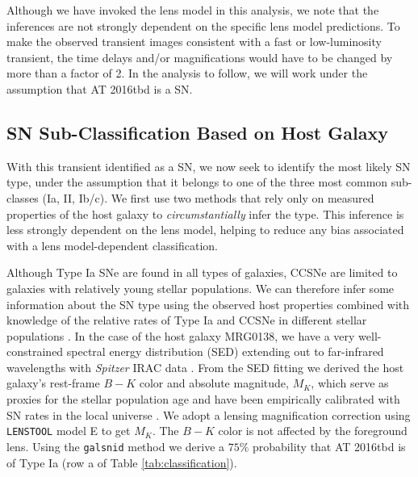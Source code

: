 \documentclass[12pt]{article}
\def\SNABC{AT 2016tbd\xspace}
\def\lenstool{{\tt LENSTOOL}\xspace}
\begin{document}
{Although we have invoked the lens model in this analysis, we note that the inferences are not strongly dependent on the specific lens model predictions.  To make the observed transient images consistent with a fast or low-luminosity transient, the time delays and/or magnifications would have to be changed by more than a factor of 2.  In the analysis to follow, we will work under the assumption that \SNABC is a SN. 


\subsection*{SN Sub-Classification Based on Host Galaxy}
With this transient identified as a SN, we now seek to identify the most likely SN type, under the assumption that it belongs to one of the three most common sub-classes (Ia, II, Ib/c).   We first use two methods that rely only on measured properties of the host galaxy to {\it circumstantially} infer the type. This inference is less strongly dependent on the lens model, helping to reduce any bias associated with a lens model-dependent classification. 

Although Type Ia SNe are found in all types of galaxies, CCSNe are limited to galaxies with relatively young stellar populations.  We can therefore infer some information about the SN type using the observed host properties combined with knowledge of the relative rates of Type Ia and CCSNe in different stellar populations \cite{mannucci_supernova_2005}.  In the case of the host galaxy MRG0138, we have a very well-constrained spectral energy distribution (SED) extending out to far-infrared wavelengths with \textit{Spitzer} IRAC data \cite{newman_resolving_2018,newman_resolving_2018-1}.  
From the SED fitting we derived the host galaxy's 
rest-frame $B-K$ color and absolute magnitude, $M_K$, which serve as proxies for the stellar population age and have been empirically calibrated with SN rates in the local universe \cite{foley_classifying_2013}.  We adopt a lensing magnification correction using \lenstool model E to get $M_K$.  
The $B-K$ color is not affected by the foreground lens.
Using the {\tt galsnid} method \cite{foley_classifying_2013} we 
derive a $75\%$ probability that \SNABC is of Type Ia (row a of Table \ref{tab:classification}).

}
\end{document}
